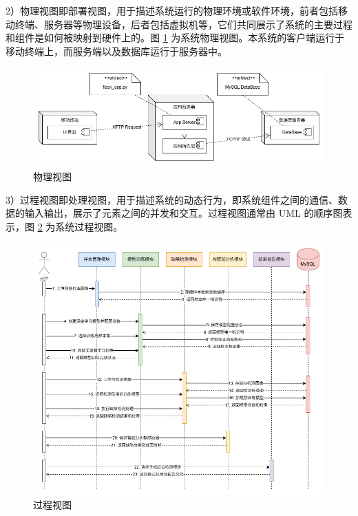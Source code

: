 \documentclass[
  ]{njuthesis}
\begin{document}
2）物理视图即部署视图，用于描述系统运行的物理环境或软件环境，前者包括移动终端、服务器等物理设备，后者包括虚拟机等，它们共同展示了系统的主要过程和组件是如何被映射到硬件上的。图 \ref{物理视图} 为系统物理视图。本系统的客户端运行于移动终端上，而服务端以及数据库运行于服务器中。

\begin{figure}[H]
    \centering
    \includegraphics[width=\textwidth]{images/物理视图.png}
    \caption{物理视图}
    \label{物理视图}
\end{figure}

3）过程视图即处理视图，用于描述系统的动态行为，即系统组件之间的通信、数据的输入输出，展示了元素之间的并发和交互。过程视图通常由 UML 的顺序图表示，图 \ref{过程视图} 为系统过程视图。

\begin{figure}[H]
    \centering
    \includegraphics[width=\textwidth]{images/过程视图.png}
    \caption{过程视图}
    \label{过程视图}
\end{figure}
\end{document}
